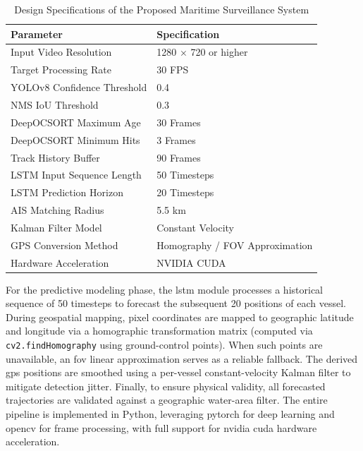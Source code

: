 \begin{table}[H]
\centering
\caption{Design Specifications of the Proposed Maritime Surveillance System}
\label{tab:design_specs}
\begin{tabular}{|l|l|}
\hline
\textbf{Parameter} & \textbf{Specification} \\
\hline
Input Video Resolution & 1280 $\times$ 720 or higher \\
\hline
Target Processing Rate & 30 FPS \\
\hline
YOLOv8 Confidence Threshold & 0.4 \\
\hline
NMS IoU Threshold & 0.3 \\
\hline
DeepOCSORT Maximum Age & 30 Frames \\
\hline
DeepOCSORT Minimum Hits & 3 Frames \\
\hline
Track History Buffer & 90 Frames \\
\hline
LSTM Input Sequence Length & 50 Timesteps \\
\hline
LSTM Prediction Horizon & 20 Timesteps \\
\hline
AIS Matching Radius & 5.5 km \\
\hline
Kalman Filter Model & Constant Velocity \\
\hline
GPS Conversion Method & Homography / FOV Approximation \\
\hline
Hardware Acceleration & NVIDIA CUDA \\
\hline
\end{tabular}
\end{table}



For the predictive modeling phase, the \gls{lstm} module processes a historical sequence of 50 timesteps to forecast the subsequent 20 positions of each vessel. During geospatial mapping, pixel coordinates are mapped to geographic latitude and longitude via a homographic transformation matrix (computed via \texttt{cv2.findHomography} using ground-control points). When such points are unavailable, an \gls{fov} linear approximation serves as a reliable fallback. The derived \gls{gps} positions are smoothed using a per-vessel constant-velocity Kalman filter to mitigate detection jitter. Finally, to ensure physical validity, all forecasted trajectories are validated against a geographic water-area filter. The entire pipeline is implemented in Python, leveraging \gls{pytorch} for deep learning and \gls{opencv} for frame processing, with full support for \gls{nvidia} \gls{cuda} hardware acceleration.

